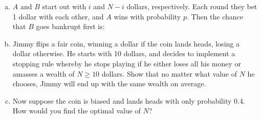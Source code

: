 \documentclass{article}
\begin{document}
\begin{enumerate}[(a)]
    \item $A$ and $B$ start out with $i$ and $N-i$ dollars, respectively. Each round they bet 1 dollar with each other, and $A$ wins with probability $p$. Then the chance that $B$ goes bankrupt first is:
    

    \item Jimmy flips a fair coin, winning a dollar if the coin lands heads, losing a dollar otherwise. He starts with 10 dollars, and decides to implement a stopping rule whereby he stops playing if he either loses all his money or amasses a wealth of $N \geq 10$ dollars. Show that no matter what value of $N$ he chooses, Jimmy will end up with the same wealth on average.
    
    
    \item Now suppose the coin is biased and lands heads with only probability 0.4. How would you find the optimal value of $N$?
    
    
    

\end{enumerate}
\end{document}
